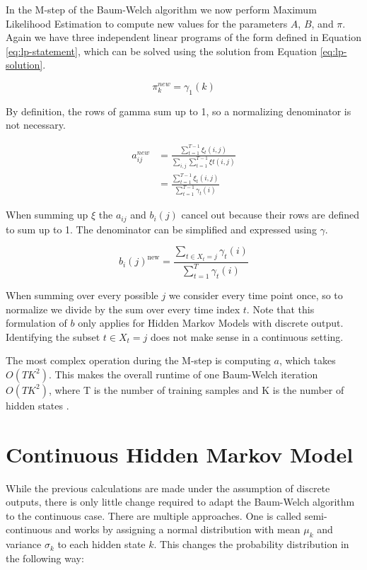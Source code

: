 In the M-step of the Baum-Welch algorithm we now perform Maximum Likelihood Estimation to compute new values for the parameters $A$, $B$, and $\pi$. Again we have three independent linear programs of the form defined in Equation \eqref{eq:lp-statement}, which can be solved using the solution from Equation \eqref{eq:lp-solution}. 

\begin{equation}
  \pi_{k}^{n e w}=\gamma_{1}(k) 
\end{equation}

By definition, the rows of gamma sum up to 1, so a normalizing denominator is not necessary. 

\begin{equation}
   \begin{aligned}
   a_{i j}^{n e w}&=\frac{\sum_{t=1}^{T-1} \xi_{t}(i, j)}{\sum_{i,j}  \sum_{t=1}^{T-1} \xi{t}(i,j)} \\
   &=\frac{\sum_{t=1}^{T-1} \xi_{t}(i, j)}{\sum_{t=1}^{T-1} \gamma_{t}(i)} 
   \end{aligned}
\end{equation}

When summing up $\xi$ the $a_{ij}$ and $b_i(j)$ cancel out because their rows are defined to sum up to 1. The denominator can be simplified and expressed using $\gamma$.

\begin{equation}
   b_{i}(j)^{\text {new}}=\frac{\sum_{t \in X_t = j} \gamma_{t}(i) }{\sum_{t=1}^{T} \gamma_{t}(i)}
\end{equation}

When summing over every possible $j$ we consider every time point once, so to normalize we divide by the sum over every time index $t$. Note that this formulation of $b$ only applies for Hidden Markov Models with discrete output. Identifying the subset $t \in X_t=j$ does not make sense in a continuous setting. 

The most complex operation during the M-step is computing $a$, which takes $O(TK^2)$. This makes the overall runtime of one Baum-Welch iteration $O(TK^2)$, where T is the number of training samples and K is the number of hidden states \parencite{miningmassivedatasets}.

\section{Continuous Hidden Markov Model}

While the previous calculations are made under the assumption of discrete outputs, there is only little change required to adapt the Baum-Welch algorithm to the continuous case. There are multiple approaches. One is called semi-continuous and works by assigning a normal distribution with mean $\mu_k$ and variance $\sigma_k$ to each hidden state $k$. This changes the probability distribution in the following way:

